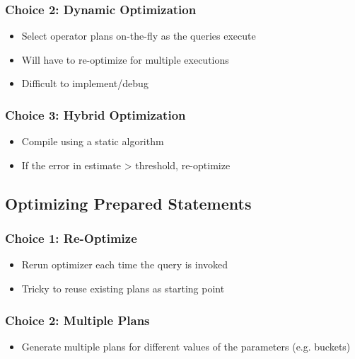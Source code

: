 \documentclass[11pt]{article}
\begin{document}
        \subsubsection*{Choice 2: Dynamic Optimization}
        \begin{itemize}
            \item Select operator plans on-the-fly as the queries execute
            \item Will have to re-optimize for multiple executions
            \item Difficult to implement/debug
        \end{itemize}

        \subsubsection*{Choice 3: Hybrid Optimization}
        \begin{itemize}
            \item Compile using a static algorithm
            \item If the error in estimate > threshold, re-optimize
        \end{itemize}

    \subsection*{Optimizing Prepared Statements}

        \subsubsection*{Choice 1: Re-Optimize}
        \begin{itemize}
            \item Rerun optimizer each time the query is invoked
            \item Tricky to reuse existing plans as starting point
        \end{itemize}

        \subsubsection*{Choice 2: Multiple Plans}
        \begin{itemize}
            \item Generate multiple plans for different values of the parameters (e.g. buckets)
        \end{itemize}
\end{document}

